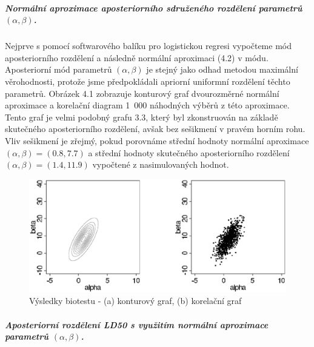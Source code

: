 \subparagraph{Normální aproximace aposteriorního sdruženého rozdělení parametrů $(\alpha, \beta)$.}

Nejprve s pomocí softwarového balíku pro logistickou regresi vypočteme mód aposteriorního rozdělení a následně normální aproximaci (4.2) v módu. Aposteriorní mód parametrů $(\alpha, \beta)$ je stejný jako odhad metodou maximální věrohodnosti, protože jsme předpokládali apriorní uniformní rozdělení těchto parametrů. Obrázek 4.1 zobrazuje konturový graf dvourozměrné normální aproximace a korelační diagram 1~000 náhodných výběrů z této aproximace. Tento graf je velmi podobný grafu 3.3, který byl zkonstruován na základě skutečného aposteriorního rozdělení, avšak bez sešikmení v pravém horním rohu. Vliv sešikmení je zřejmý, pokud porovnáme střední hodnoty normální aproximace $(\alpha, \beta) = (0.8, 7.7)$ a střední hodnoty skutečného aposteriorního rozdělení $(\alpha, \beta) = (1.4, 11.9)$ vypočtené z nasimulovaných hodnot.
\begin{figure}[htp]
\centering
\includegraphics[scale = 0.45]{pictures/fig_4_1.eps}
\caption{Výsledky biotestu - (a) konturový graf, (b) korelační graf}
\label{fig_4_1}
\end{figure}

\subparagraph{Aposteriorní rozdělení LD50 s využitím normální aproximace parametrů $(\alpha, \beta)$.}


